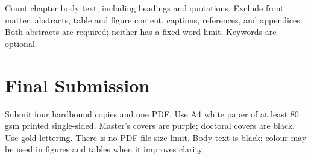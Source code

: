 Count chapter body text, including headings and quotations. Exclude front
matter, abstracts, table and figure content, captions, references, and
appendices. Both abstracts are required; neither has a fixed word limit.
Keywords are optional.

\section{Final Submission}

Submit four hardbound copies and one PDF. Use A4 white paper of at least 80 gsm
printed single-sided. Master's covers are purple; doctoral covers are black.
Use gold lettering. There is no PDF file-size limit. Body text is black; colour
may be used in figures and tables when it improves clarity.
